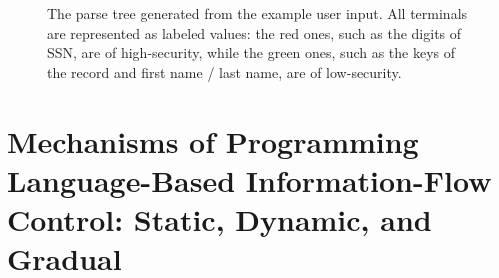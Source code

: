 \begin{figure*}[tbp]
  \small
  \center
{}
\caption{The parse tree generated from the example user input.
  All terminals are represented as labeled values:
  the {\color{red} red} ones, such as the digits of SSN,
  are of high-security, while the {\color{green} green} ones, such as the keys
  of the record and first name / last name, are of low-security.}
\label{fig:parsetree}
\end{figure*}

\section{Mechanisms of Programming Language-Based
  Information-Flow Control: Static, Dynamic, and Gradual}

